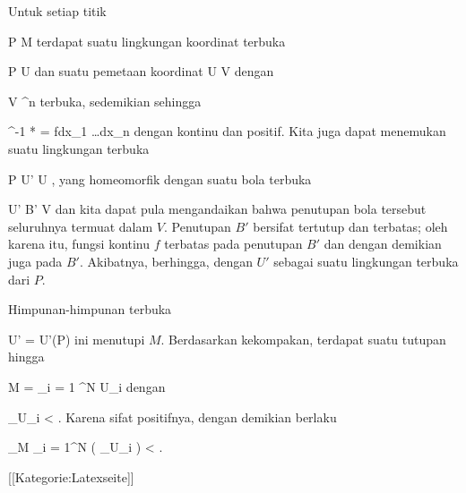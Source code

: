 Untuk setiap titik

\mavergleichskette
{\vergleichskette
{ P
}
{ \in }{ M
}
{  }{
}
{    }{
}
{   }{
}
}
{}{}{}
terdapat suatu lingkungan koordinat terbuka

\mavergleichskette
{\vergleichskette
{ P
}
{ \in }{ U
}
{  }{
}
{    }{
}
{   }{
}
}
{}{}{}
dan suatu pemetaan koordinat
\maabbdisp {\alpha} { U } { V
} {}
dengan

\mavergleichskette
{\vergleichskette
{ V
}
{ \subseteq }{ \R^n
}
{  }{
}
{    }{
}
{   }{
}
}
{}{}{}
terbuka, sedemikian sehingga

\mavergleichskette
{\vergleichskette
{ \alpha^{-1 *} \omega
}
{ = }{ fdx_1 \wedge \ldots \wedge dx_n
}
{  }{
}
{    }{
}
{   }{
}
}
{}{}{}
dengan
 kontinu dan positif. Kita juga dapat menemukan suatu lingkungan terbuka

\mavergleichskette
{\vergleichskette
{ P
}
{ \in }{ U'
}
{ \subseteq }{ U
}
{    }{
}
{   }{
}
}
{}{}{,}
yang homeomorfik dengan suatu bola terbuka

\mavergleichskette
{\vergleichskette
{ U'
}
{ \cong }{ B'
}
{ \subseteq }{ V
}
{    }{
}
{   }{
}
}
{}{}{}
dan kita dapat pula mengandaikan bahwa penutupan bola tersebut seluruhnya termuat dalam $V$. Penutupan $B'$ bersifat tertutup dan terbatas; oleh karena itu, fungsi kontinu $f$ terbatas pada penutupan $B'$ dan dengan demikian juga pada $B'$. Akibatnya,
 berhingga, dengan $U'$ sebagai suatu lingkungan terbuka dari $P$.

Himpunan-himpunan terbuka

\mavergleichskette
{\vergleichskette
{ U'
}
{ = }{ U'(P)
}
{  }{
}
{    }{
}
{   }{
}
}
{}{}{}
ini menutupi $M$. Berdasarkan kekompakan, terdapat suatu tutupan hingga

\mavergleichskettedisp
{\vergleichskette
{ M
}
{ =} { \bigcup_{i = 1} ^N U_i
}
{ } {
}
{ } {
}
{ } {
}
}
{}{}{}
dengan

\mavergleichskettedisp
{\vergleichskette
{ \int_{U_i } \omega
}
{ <} { \infty
}
{ } {
}
{ } {
}
{ } {
}
}
{}{}{.}
Karena sifat positifnya, dengan demikian berlaku

\mavergleichskettedisp
{\vergleichskette
{ \int_{M} \omega
}
{ \leq} { \sum_{i = 1}^N  \left(  \int_{U_i } \omega  \right)
}
{ <} { \infty
}
{ } {
}
{ } {
}
}
{}{}{.}

 [[Kategorie:Latexseite]]
